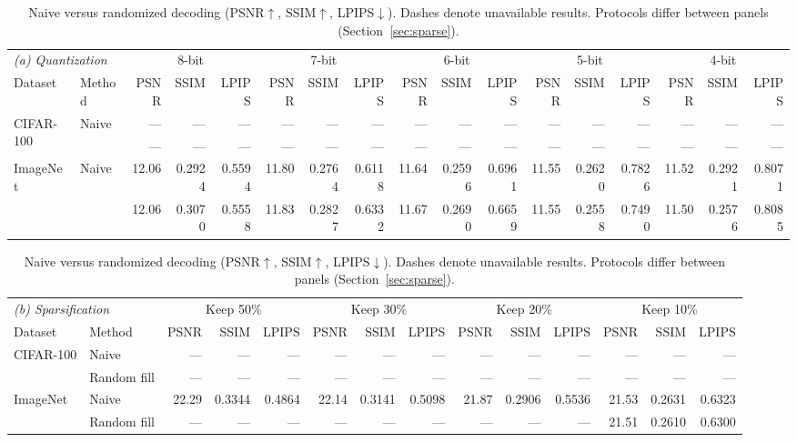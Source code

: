 \begin{table}[!t]
\centering
\caption{Naive versus randomized decoding (PSNR$\uparrow$, SSIM$\uparrow$,
LPIPS$\downarrow$). Dashes denote unavailable results.
Protocols differ between panels (Section~\ref{sec:sparse}).}
\label{tab:compression}
\label{tab:bits}
\small
\setlength{\tabcolsep}{1.2pt}
\renewcommand{\arraystretch}{1.0}
\begin{tabular*}{\textwidth}{@{\extracolsep{\fill}}llrrrrrrrrrrrrrrr@{}}
\toprule
\multicolumn{2}{l}{\textit{(a) Quantization}} & \multicolumn{3}{c}{8-bit} & \multicolumn{3}{c}{7-bit} & \multicolumn{3}{c}{6-bit} & \multicolumn{3}{c}{5-bit} & \multicolumn{3}{c}{4-bit}\\
\cmidrule(lr){3-5}\cmidrule(lr){6-8}\cmidrule(lr){9-11}\cmidrule(lr){12-14}\cmidrule(lr){15-17}
Dataset & Method & PSNR & SSIM & LPIPS & PSNR & SSIM & LPIPS & PSNR & SSIM & LPIPS & PSNR & SSIM & LPIPS & PSNR & SSIM & LPIPS\\
\midrule
\multirow{2}{*}{CIFAR-100} & Naive & --- & --- & --- & --- & --- & --- & --- & --- & --- & --- & --- & --- & --- & --- & ---\\
 & \cora{} & --- & --- & --- & --- & --- & --- & --- & --- & --- & --- & --- & --- & --- & --- & ---\\
\midrule
\multirow{2}{*}{ImageNet} & Naive & 12.06 & 0.2924 & 0.5594 & 11.80 & 0.2764 & 0.6118 & 11.64 & 0.2596 & 0.6961 & 11.55 & 0.2620 & 0.7826 & 11.52 & 0.2921 & 0.8071\\
 & \cora{} & 12.06 & 0.3070 & 0.5558 & 11.83 & 0.2827 & 0.6332 & 11.67 & 0.2690 & 0.6659 & 11.55 & 0.2558 & 0.7490 & 11.50 & 0.2576 & 0.8085\\
\bottomrule
\end{tabular*}
\par\smallskip
\begin{tabular*}{\textwidth}{@{\extracolsep{\fill}}llrrrrrrrrrrrr@{}}
\toprule
\multicolumn{2}{l}{\textit{(b) Sparsification}} & \multicolumn{3}{c}{Keep 50\%} & \multicolumn{3}{c}{Keep 30\%} & \multicolumn{3}{c}{Keep 20\%} & \multicolumn{3}{c}{Keep 10\%}\\
\cmidrule(lr){3-5}\cmidrule(lr){6-8}\cmidrule(lr){9-11}\cmidrule(lr){12-14}
Dataset & Method & PSNR & SSIM & LPIPS & PSNR & SSIM & LPIPS & PSNR & SSIM & LPIPS & PSNR & SSIM & LPIPS\\
\midrule
\multirow{2}{*}{CIFAR-100} & Naive & --- & --- & --- & --- & --- & --- & --- & --- & --- & --- & --- & ---\\
 & Random fill & --- & --- & --- & --- & --- & --- & --- & --- & --- & --- & --- & ---\\
\midrule
\multirow{2}{*}{ImageNet} & Naive & 22.29 & 0.3344 & 0.4864 & 22.14 & 0.3141 & 0.5098 & 21.87 & 0.2906 & 0.5536 & 21.53 & 0.2631 & 0.6323\\
 & Random fill & --- & --- & --- & --- & --- & --- & --- & --- & --- & 21.51 & 0.2610 & 0.6300\\
\bottomrule
\end{tabular*}
\end{table}
